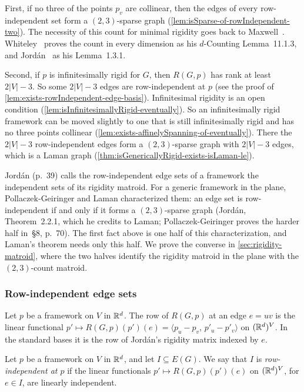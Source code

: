 First, if no three of the points $p_v$ are collinear, then the edges of
every row-independent set form a $(2,3)$-sparse graph
(\cref{lem:isSparse-of-rowIndependent-two}). The necessity of this
count for minimal rigidity goes back to Maxwell~\cite{maxwell1864}.
Whiteley~\cite{whiteley1996} proves the count in every dimension as his
$d$-Counting Lemma~11.1.3, and Jord\'an~\cite{jordan2016} as his
Lemma~1.3.1.

Second, if $p$ is infinitesimally rigid for $G$, then $R(G, p)$ has
rank at least $2|V| - 3$. So some $2|V| - 3$ edges are row-independent
at $p$ (see the proof of \cref{lem:exists-rowIndependent-edge-basis}).
Infinitesimal rigidity is an open condition
(\cref{lem:isInfinitesimallyRigid-eventually}). So an infinitesimally
rigid framework can be moved slightly to one that is still
infinitesimally rigid and has no three points collinear
(\cref{lem:exists-affinelySpanning-of-eventually}). There the
$2|V| - 3$ row-independent edges form a $(2,3)$-sparse graph with
$2|V| - 3$ edges, which is a Laman graph
(\cref{thm:isGenericallyRigid-exists-isLaman-le}).

Jord\'an (p.~39) calls the row-independent edge sets of a framework the
independent sets of its rigidity matroid. For a generic framework in
the plane, Pollaczek-Geiringer and Laman characterized them: an edge set
is row-independent if and only if it forms a $(2,3)$-sparse graph
(Jord\'an, Theorem~2.2.1, which he credits to Laman; Pollaczek-Geiringer
proves the harder half in~\S8, p.~70). The first fact above is one half
of this characterization, and Laman's theorem needs only this half. We
prove the converse in \cref{sec:rigidity-matroid}, where the two halves
identify the rigidity matroid in the plane with the $(2,3)$-count
matroid.

\subsubsection{Row-independent edge sets}

Let $p$ be a framework on $V$ in ${\mathbb{R}}^{d}$. The row of $R(G, p)$ at an
edge $e = uv$ is the linear functional
$p' \mapsto R(G, p)(p')(e) = \langle p_u - p_v,\, p'_u - p'_v \rangle$
on $({\mathbb{R}}^{d})^{V}$. In the standard bases it is the row of Jord\'an's
rigidity matrix indexed by $e$.

\begin{definition}
  \label{def:edgeSet-rowIndependent}
  \leanok
  Let $p$ be a framework on $V$ in ${\mathbb{R}}^{d}$, and let
  $I \subseteq E(G)$. We say that $I$ is \emph{row-independent at $p$}
  if the linear functionals $p' \mapsto R(G, p)(p')(e)$ on
  $({\mathbb{R}}^{d})^{V}$, for $e \in I$, are linearly independent.
\end{definition}

